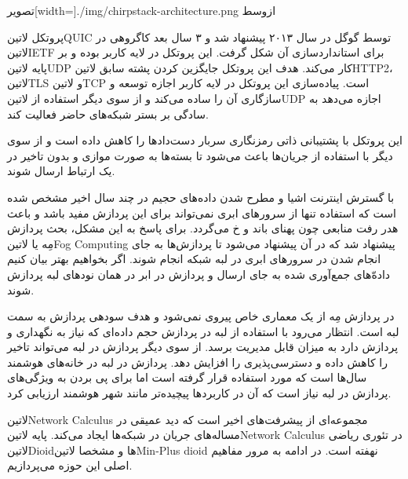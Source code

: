 ‌تصویر[width=\textwidth]{./img/chirpstack-architecture.png}
‌ازوسط


پروتکل ‌لاتین{QUIC} توسط گوگل در سال ۲۰۱۳ پیشنهاد شد و ۳ سال بعد کاگروهی در ‌لاتین{IETF} برای استانداردسازی آن شکل گرفت. این پروتکل در لایه کاربر بوده و بر پایه ‌لاتین{UDP} کار می‌کند.
هدف این پروتکل جایگزین کردن پشته سابق ‌لاتین{HTTP2}، ‌لاتین{TLS} و ‌لاتین{TCP} است.
پیاده‌سازی این پروتکل در لایه کاربر اجازه توسعه و سازگاری آن را ساده می‌کند و از سوی دیگر استفاده از ‌لاتین{UDP} اجازه می‌دهد به سادگی بر بستر شبکه‌های حاضر فعالیت کند.

این پروتکل با پشتیبانی ذاتی رمزنگاری سربار دست‌دادها را کاهش داده است و از سوی دیگر با استفاده از جریان‌ها باعث می‌شود تا بسته‌ها به صورت موازی و بدون تاخیر در یک ارتباط ارسال شوند.


با گسترش اینترنت اشیا و مطرح شدن داده‌های حجیم در چند سال اخیر مشخص شده است که استفاده تنها از سرورهای ابری نمی‌تواند برای این پردازش مفید باشد و باعث هدر رفت منابعی چون پهنای باند و ‌خ می‌گردد.
برای پاسخ به این مشکل، بحث پردازش مِه یا ‌لاتین{Fog Computing} پیشنهاد شد که در آن پیشنهاد می‌شود تا پردازش‌ها به جای انجام شدن در سرورهای ابری در لبه شبکه انجام شوند.
اگر بخواهیم بهتر بیان کنیم داده‌ّهای جمع‌آوری شده به جای ارسال و پردازش در ابر در همان نودهای لبه پردازش شوند.

در پردازش مِه از یک معماری خاص پیروی نمی‌شود و هدف سودهی پردازش به سمت لبه است. انتظار می‌رود با استفاده از لبه در پردازش حجم داده‌ای که نیاز به نگهداری و پردازش دارد به میزان قابل مدیریت برسد.
از سوی دیگر پردازش در لبه می‌تواند تاخیر را کاهش داده و دسترسی‌پذیری را افزایش دهد. پردازش در لبه در خانه‌های هوشمند سال‌ها است که مورد استفاده قرار گرفته است اما برای پی بردن به ویژگی‌های پردازش در لبه
نیاز است که آن در کاربردها پیچیده‌تر مانند شهر هوشمند ارزیابی کرد.


‌لاتین{Network Calculus} مجموعه‌ای از پیشرفت‌های اخیر است که دید عمیقی در مساله‌های جریان در شبکه‌ها ایجاد می‌کند. پایه ‌لاتین{Network Calculus} در تئوری ریاضی ‌لاتین{Dioid}ها و مشخصا ‌لاتین{Min-Plus dioid} نهفته است.
در ادامه به مرور مفاهیم اصلی این حوزه می‌پردازیم.

